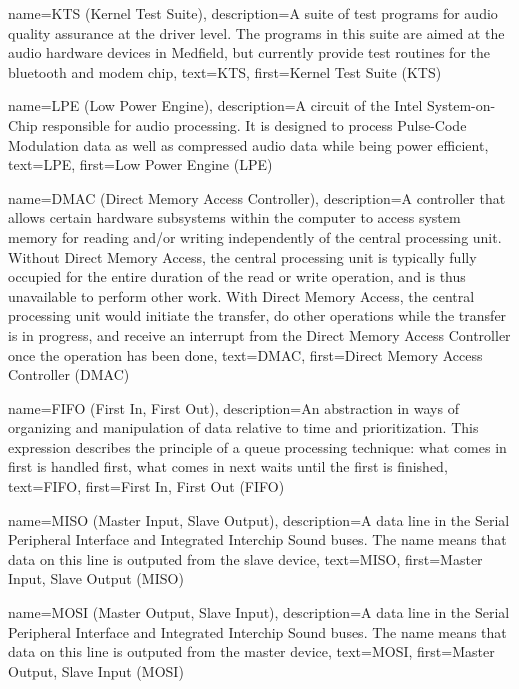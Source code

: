 {
  name=KTS (Kernel Test Suite),
  description={A suite of test programs for audio quality assurance at
    the driver level. The programs in this suite are aimed at the
    audio hardware devices in Medfield, but currently provide test
    routines for the bluetooth and modem chip},
  text=KTS,
  first=Kernel Test Suite (KTS)
}


{
  name=LPE (Low Power Engine),
  description={A circuit of the Intel System-on-Chip responsible for
    audio processing. It is designed to process Pulse-Code Modulation
    data as well as compressed audio data while being power efficient},
  text=LPE,
  first=Low Power Engine (LPE)
}

{
  name=DMAC (Direct Memory Access Controller),
  description={A controller that allows certain hardware subsystems
    within the computer to access system memory for reading and/or
    writing independently of the central processing unit. Without
    Direct Memory Access, the central processing unit is typically
    fully occupied for the entire duration of the read or write
    operation, and is thus unavailable to perform other work. With
    Direct Memory Access, the central processing unit would initiate
    the transfer, do other operations while the transfer is in
    progress, and receive an interrupt from the Direct Memory Access
    Controller once the operation has been done},
  text=DMAC,
  first=Direct Memory Access Controller (DMAC)
}

{
  name={FIFO (First In, First Out)},
  description={An abstraction in ways of organizing and manipulation
    of data relative to time and prioritization. This expression
    describes the principle of a queue processing technique: what
    comes in first is handled first, what comes in next waits until
    the first is finished},
  text=FIFO,
  first={First In, First Out (FIFO)}
}

{
  name={MISO (Master Input, Slave Output)},
  description={A data line in the Serial Peripheral Interface and
    Integrated Interchip Sound buses. The name means that data on this
    line is outputed from the slave device},
  text=MISO,
  first={Master Input, Slave Output (MISO)}
}

{
  name={MOSI (Master Output, Slave Input)},
  description={A data line in the Serial Peripheral Interface and
    Integrated Interchip Sound buses. The name means that data on this
    line is outputed from the master device},
  text=MOSI,
  first={Master Output, Slave Input (MOSI)}
}

